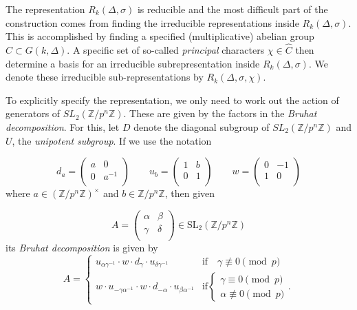 \documentclass[12pt,reqno]{amsart}
\theoremstyle{remark}
\numberwithin{table}{section}
\newcommand{\Z}{\mathbb Z}
\begin{document}
The representation $R_k(\Delta, \sigma)$ is reducible and the most difficult part of the construction comes from finding the irreducible representations inside $R_k(\Delta, \sigma)$. This is accomplished by finding a specified (multiplicative) abelian group $C \subset G(k,\Delta)$. A specific set of so-called {\em principal} characters $\chi \in \widehat{C}$ then determine a basis for an irreducible subrepresentation inside $R_k(\Delta, \sigma)$. We denote  these irreducible sub-representations by $R_k(\Delta, \sigma, \chi)$. 

To explicitly specify the representation, we only need to work out the action of generators  of $SL_2(\Z/p^n \Z)$. These are given by the factors in the {\em Bruhat decomposition}.  For this, let $D$ denote the diagonal subgroup of $SL_2(\Z/p^n \Z)$ and $U$, the {\em unipotent subgroup}. If we use the notation

\[ d_a = \left(
\begin{array}{cc}
a & 0 \\
0 & a^{-1} \\
\end{array} \right) \quad  \quad  u_b = \left(
\begin{array}{cc}
1 & b \\
0 & 1 \\
\end{array} \right)  \quad \quad w = \left(
\begin{array}{cc}
0 & -1 \\
1 & 0 \\
\end{array} \right)\]
where $a \in (\Z/p^n \Z)^\times$ and $b \in \Z/p^n \Z$, then given   

\[ A =  \left( \begin{array}{cc}
\alpha & \beta \\
\gamma & \delta \\
\end{array} \right)\in \text{SL$_2$}(\Z/p^n \Z)\]
its {\em Bruhat decomposition} is given by
\begin{equation} A =\begin{cases} u_{\alpha\gamma^{-1}}\cdot w \cdot d_\gamma \cdot u_{\delta \gamma^{-1}}  & \text{if} \quad \gamma \not \equiv 0  \pmod{p}\\
w \cdot u_{-\gamma\alpha^{-1}} \cdot w \cdot  d_{-\alpha}\cdot  u_{\beta\alpha^{-1}}  & \text{if} \left\{\begin{array}{l}  \gamma \equiv 0 \pmod{p}\\  \alpha \not \equiv 0  \pmod{p}\end{array}\right. . \end{cases}\end{equation}\label{Bruhat}
\end{document}

